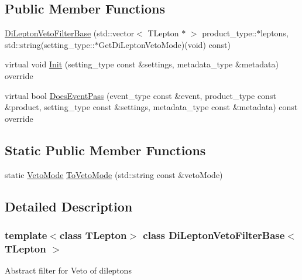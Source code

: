 \subsection*{Public Member Functions}
\begin{DoxyCompactItemize}
\item 
\hyperlink{classDiLeptonVetoFilterBase_acaa3d72c0af99599541c3fcb11829184}{DiLeptonVetoFilterBase} (std::vector$<$ TLepton $\ast$ $>$ product\_\-type::$\ast$leptons, std::string(setting\_\-type::$\ast$GetDiLeptonVetoMode)(void) const)
\item 
virtual void \hyperlink{classDiLeptonVetoFilterBase_a6a332de68628eb7626a66d529930493e}{Init} (setting\_\-type const \&settings, metadata\_\-type \&metadata) override
\item 
virtual bool \hyperlink{classDiLeptonVetoFilterBase_a762d65d117fba9ecc691e4ade7bca8a3}{DoesEventPass} (event\_\-type const \&event, product\_\-type const \&product, setting\_\-type const \&settings, metadata\_\-type const \&metadata) const override
\end{DoxyCompactItemize}
\subsection*{Static Public Member Functions}
\begin{DoxyCompactItemize}
\item 
static \hyperlink{classDiLeptonVetoFilterBase_a61fbc3c58cdc545f10826f677cecd0fe}{VetoMode} \hyperlink{classDiLeptonVetoFilterBase_a9e4842d8a50e4bb01838013c43d8dd17}{ToVetoMode} (std::string const \&vetoMode)
\end{DoxyCompactItemize}


\subsection{Detailed Description}
\subsubsection*{template$<$class TLepton$>$ class DiLeptonVetoFilterBase$<$ TLepton $>$}

Abstract filter for Veto of dileptons 

